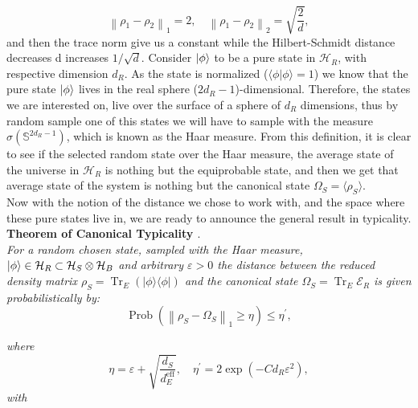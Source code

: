 \begin{equation}
\left\|\rho_{1}-\rho_{2}\right\|_{1}=2, \quad\left\|\rho_{1}-\rho_{2}\right\|_{2}=\sqrt{\frac{2}{d}},
\label{CH1:Example_1}
\end{equation}
and then the trace norm give us a constant while the Hilbert-Schmidt distance decreases d increases $1/\sqrt{d}$.
\newline
Consider $\mathinner{|{\phi}\rangle}$ to be a pure state in $\mathcal{H}_R$, with respective dimension $d_R$. As the state is normalized ($\langle\phi | \phi\rangle=1$) we know that the pure state $\mathinner{|{\phi}\rangle}$ lives in the real sphere ($2d_R-1$)-dimensional. Therefore, the states we are interested on, live over the surface of a sphere of $d_R$ dimensions, thus by random sample one of this states we will have to sample with the measure $\sigma(\mathbb{S}^{2d_R-1})$, which is known as the Haar measure. From this definition, it is clear to see if the selected random state over the Haar measure, the average state of the universe in $\mathcal{H}_R$ is nothing but the equiprobable state, and then we get that average state of the system is nothing but the canonical state $\Omega_S = \langle \rho_S\rangle$.\\


Now with the notion of the distance we chose to work with, and the space where these pure states live in, we are ready to announce the general result in typicality.\\


\textbf{Theorem of Canonical Typicality \cite{popescu_entanglement_2006,popescu_foundations_2005}}.\\


\textit{For a random chosen state, sampled with the Haar measure, $\mathinner{|{\phi}\rangle}\in\mathcal{H}_R\subset\mathcal{H}_S\otimes\mathcal{H}_B$ and arbitrary $\varepsilon >0$ the distance between the reduced density matrix $\rho_{S}=\operatorname{Tr}_{E}(|\phi\rangle\langle\phi|)$ and the canonical state $\Omega_S=\operatorname{Tr}_E\mathcal{E}_R$ is given probabilistically by:}
\begin{equation}
\operatorname{Prob}\left(\left\|\rho_{S}-\Omega_{S}\right\|_{1} \geq \eta\right) \leq \eta^{\prime},
\label{CH1:Typicality_result_1}
\end{equation}

\textit{where}
\begin{equation}
\eta=\varepsilon+\sqrt{\frac{d_{S}}{d_{E}^{\mathrm{eff}}}}, \quad \eta^{\prime}=2 \exp \left(-C d_{R} \varepsilon^{2}\right),
\label{CH1:Typicality_result_1_1}
\end{equation}
\textit{with}

